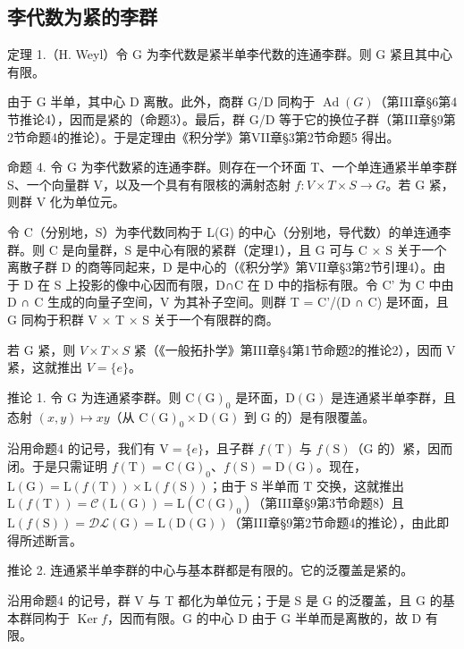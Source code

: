 \subsection{李代数为紧的李群}

定理 1.（H. Weyl）令 G 为李代数是紧半单李代数的连通李群。则 G 紧且其中心有限。

由于 G 半单，其中心 D 离散。此外，商群 G/D 同构于 \(\operatorname{Ad}(G)\)（第III章§6第4节推论4），因而是紧的（命题3）。最后，群 G/D 等于它的换位子群（第III章§9第2节命题4的推论）。于是定理由《积分学》第VII章§3第2节命题5 得出。

命题 4. 令 G 为李代数紧的连通李群。则存在一个环面 T、一个单连通紧半单李群 S、一个向量群 V，以及一个具有有限核的满射态射 \(f: V \times T \times S \to G\)。若 G 紧，则群 V 化为单位元。

令 C（分别地，S）为李代数同构于 L(G) 的中心（分别地，导代数）的单连通李群。则 C 是向量群，S 是中心有限的紧群（定理1），且 G 可与 C × S 关于一个离散子群 D 的商等同起来，D 是中心的（《积分学》第VII章§3第2节引理4）。由于 D 在 S 上投影的像中心因而有限，D∩C 在 D 中的指标有限。令 C' 为 C 中由 D ∩ C 生成的向量子空间，V 为其补子空间。则群 T = C'/(D ∩ C) 是环面，且 G 同构于积群 V × T × S 关于一个有限群的商。

若 G 紧，则 \(V \times T \times S\) 紧（《一般拓扑学》第III章§4第1节命题2的推论2），因而 V 紧，这就推出 \(V = \{e\}\)。

推论 1. 令 G 为连通紧李群。则 \(\mathrm{C}(\mathrm{G})_{0}\) 是环面，\(\mathrm{D}(\mathrm{G})\) 是连通紧半单李群，且态射 \((x,y)\mapsto xy\)（从 \(\mathrm{C}(\mathrm{G})_{0}\times\mathrm{D}(\mathrm{G})\) 到 G 的）是有限覆盖。

沿用命题4 的记号，我们有 \(\mathrm{V} = \{e\}\)，且子群 \(f(\mathrm{T})\) 与 \(f(\mathrm{S})\)（\(\mathrm{G}\) 的）紧，因而闭。于是只需证明 \(f(\mathrm{T}) = \mathrm{C}(\mathrm{G})_0\)、\(f(\mathrm{S}) = \mathrm{D}(\mathrm{G})\)。现在，\(\mathrm{L}(\mathrm{G}) = \mathrm{L}(f(\mathrm{T})) \times \mathrm{L}(f(\mathrm{S}))\)；由于 \(\mathrm{S}\) 半单而 \(\mathrm{T}\) 交换，这就推出 \(\mathrm{L}(f(\mathrm{T})) = \mathcal{C}(\mathrm{L}(\mathrm{G})) = \mathrm{L}(\mathrm{C}(\mathrm{G})_0)\)（第III章§9第3节命题8）且 \(\mathrm{L}(f(\mathrm{S})) = \mathcal{DL}(\mathrm{G}) = \mathrm{L}(\mathrm{D}(\mathrm{G}))\)（第III章§9第2节命题4的推论），由此即得所述断言。

推论 2. 连通紧半单李群的中心与基本群都是有限的。它的泛覆盖是紧的。

沿用命题4 的记号，群 V 与 T 都化为单位元；于是 S 是 G 的泛覆盖，且 G 的基本群同构于 \(\operatorname{Ker} f\)，因而有限。G 的中心 D 由于 G 半单而是离散的，故 D 有限。

